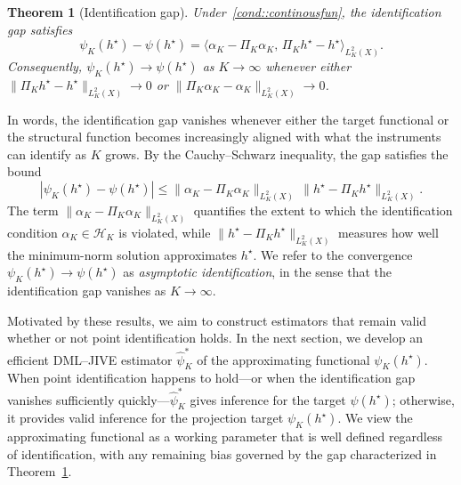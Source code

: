 \documentclass[11pt]{article}
\theoremstyle{plain}
\newtheorem{theorem}{Theorem}
\theoremstyle{definition}
\theoremstyle{remark}
\theoremstyle{definition}
\begin{document}
\begin{theorem}[Identification gap]
\label{theorem::approx}\label{theorem::asymident}
Under~\ref{cond::continousfun}, the identification gap satisfies
\[
\psi_K(h^\star) - \psi(h^\star)
  = \langle \alpha_K - \Pi_K \alpha_K,\,
           \Pi_K h^\star - h^\star \rangle_{L^2_K(X)}.
\]
Consequently, \( \psi_K(h^\star) \to \psi(h^\star) \) as \( K \to \infty \)
whenever either \( \|\Pi_K h^\star - h^\star\|_{L^2_K(X)} \to 0 \) or
\( \|\Pi_K \alpha_K - \alpha_K\|_{L^2_K(X)} \to 0 \).
\end{theorem}

In words, the identification gap vanishes whenever either the target functional
or the structural function becomes increasingly aligned with what the
instruments can identify as $K$ grows. By the Cauchy--Schwarz inequality, the gap satisfies the bound
\[
|\psi_K(h^\star) - \psi(h^\star)|
   \le \|\alpha_K - \Pi_K \alpha_K\|_{L^2_K(X)}\,
        \|h^\star - \Pi_K h^\star\|_{L^2_K(X)}.
\]
The term \(\|\alpha_K - \Pi_K \alpha_K\|_{L^2_K(X)}\) quantifies the extent to
which the identification condition \(\alpha_K \in \mathcal{H}_K\) is violated,
while \(\|h^\star - \Pi_K h^\star\|_{L^2_K(X)}\) measures how well the
minimum-norm solution approximates \(h^\star\). We refer to the convergence
\(\psi_K(h^\star) \to \psi(h^\star)\) as \emph{asymptotic identification}, in
the sense that the identification gap vanishes as \(K \to \infty\).





Motivated by these results, we aim to construct estimators that remain valid
whether or not point identification holds. In the next section, we develop an
efficient DML–JIVE estimator \( \widehat{\psi}_K^* \) of the approximating
functional \( \psi_K(h^\star) \). When point identification happens to hold---or
when the identification gap vanishes sufficiently quickly---\(\widehat{\psi}_K^*\)
gives inference for the target \( \psi(h^\star) \); otherwise, it provides valid
inference for the projection target \( \psi_K(h^\star) \). We view the
approximating functional as a working parameter that is well defined regardless
of identification, with any remaining bias governed by the gap characterized in
Theorem~\ref{theorem::approx}.
\end{document}
